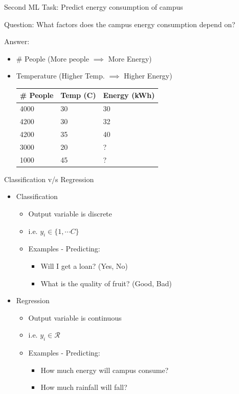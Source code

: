 \documentclass[usenames,dvipsnames]{beamer}
\begin{document}
\begin{frame}{Second ML Task: Predict energy consumption of campus}

Question: What factors does the campus energy consumption depend on?

Answer:\begin{itemize}
	\item \# People (More people $\implies$ More Energy)
	\item Temperature (Higher Temp. $\implies$ Higher Energy)

\begin{table}[]
	\begin{tabular}{|l|l||l|}
		\hline 
		
		\textbf{\# People} & \textbf{Temp (C)} &  \textbf{Energy (kWh)} \\ \hline 
		
		4000 & 30 & 30 \\
		4200 & 30 & 32 \\
		4200 & 35 & 40 \\ \hline
		3000 & 20& ? \\
		1000 & 45 & ? \\ \hline          
	\end{tabular}
\end{table}	
\end{itemize}

\end{frame}





\begin{frame}{Classification v/s Regression}
\begin{itemize}
	\item Classification
	\begin{itemize}
		\item Output variable is discrete
		\item i.e.  $y_i\in \{1, \cdots C\}$ 
		\item Examples - Predicting: 
		\begin{itemize}
			\item Will I get a loan? (Yes, No)
			\item What is the quality of fruit? (Good, Bad)
		\end{itemize}
	\end{itemize}
	\item Regression
	\begin{itemize}
		\item Output variable is continuous
		\item i.e.  $y_i\in \mathcal{R}$ 
		\item Examples - Predicting: 
		\begin{itemize}
			\item How much energy will campus consume? 
			\item How much rainfall will fall?
		\end{itemize}
	\end{itemize}
\end{itemize}

\end{frame}
\end{document}

